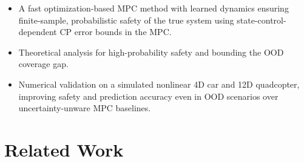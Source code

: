 \documentclass{l4dc2026}
\begin{document}
\vspace{-8pt}
\begin{itemize}
    \itemsep-0.35em
    \item A fast optimization-based MPC method with learned dynamics ensuring finite-sample, probabilistic safety of the true system using state-control-dependent CP error bounds in the MPC.%
    \item Theoretical analysis for high-probability safety and bounding the OOD coverage gap.
    \item Numerical validation on a simulated nonlinear 4D car and 12D quadcopter, improving safety and prediction accuracy even in OOD scenarios over uncertainty-unware MPC baselines.
\end{itemize}

\vspace{-25pt}
\section{Related Work}
\vspace{-4pt}
\end{document}
